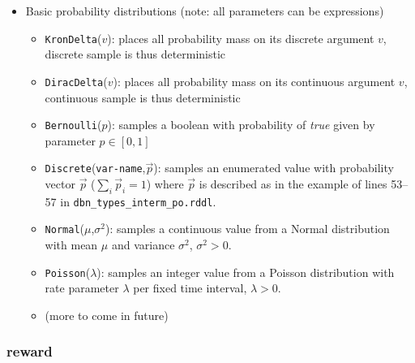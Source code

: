 \documentclass[11pt,a4paper]{article}
\begin{document}
\begin{itemize}
    \item Basic probability distributions (note: all parameters can be expressions)
    \begin{itemize}
        \item \texttt{KronDelta}($v$): places all probability mass on its discrete argument $v$, discrete sample is thus deterministic
        \item \texttt{DiracDelta}($v$): places all probability mass on its continuous argument $v$, continuous sample is thus deterministic
        \item \texttt{Bernoulli}($p$): samples a boolean with probability of {\it true} given by parameter $p \in [0,1]$
        \item \texttt{Discrete}(\texttt{var-name},$\vec{p}$): samples an enumerated value with probability vector $\vec{p}$ ($\sum_i \vec{p}_i = 1$) where $\vec{p}$ is described as in the example of lines 53--57 in \texttt{dbn\_types\_interm\_po.rddl}.
        \item \texttt{Normal}($\mu$,$\sigma^2$): samples a continuous value from a Normal distribution with mean $\mu$ and variance $\sigma^2$, $\sigma^2 > 0$.
        \item \texttt{Poisson}($\lambda$): samples an integer value from a Poisson distribution with rate parameter $\lambda$ per fixed time interval, $\lambda > 0$.
	\item (more to come in future)
    \end{itemize}
\end{itemize}


\subsubsection{reward}
\end{document}
